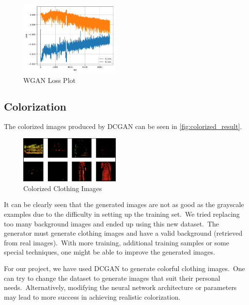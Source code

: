 \documentclass[conference]{IEEEtran}
\begin{document}
    \begin{figure}
        \caption{WGAN Loss Plot}
        \label{fig:loss-plot-wgan}
        \includegraphics[width=0.45\textwidth]{WGAN_loss.png}
        \centering
    \end{figure}

    \subsection{Colorization}\label{subsec:results-colorization}

    The colorized images produced by DCGAN can be seen in \autoref{fig:colorized_result}.

    \begin{figure}
        \caption{Colorized Clothing Images}
        \label{fig:colorized_result}
        \includegraphics[width=0.45\textwidth]{learned_result.png}
        \centering
    \end{figure}

    It can be clearly seen that the generated images are not as good as the grayscale examples due to the difficulty in setting up the training set.\ We tried replacing too many background images and ended up using this new dataset.\ The generator must generate clothing images and have a valid background (retrieved from real images).\ With more training, additional training samples or some special techniques, one might be able to improve the generated images.

    For our project, we have used DCGAN to generate colorful clothing images.\ One can try to change the dataset to generate images that suit their personal needs.\ Alternatively, modifying the neural network architecture or parameters may lead to more success in achieving realistic colorization.
\end{document}
